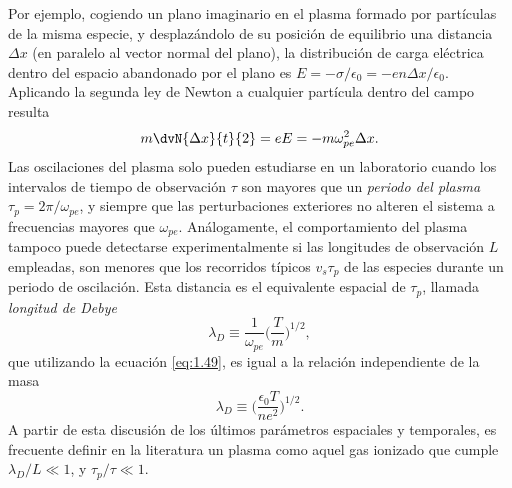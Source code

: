 Por ejemplo, cogiendo un plano imaginario en el plasma formado por partículas de la misma especie, y desplazándolo de su posición de equilibrio una distancia $\Delta x$ (en paralelo al vector normal del plano), la distribución de carga eléctrica dentro del espacio abandonado por el plano es $E = - \sigma/\epsilon_{0} = -en \Delta x/\epsilon_{0}$. Aplicando la segunda ley de Newton a cualquier partícula dentro del campo resulta
\begin{equation}\label{eq:1.50}
  m \dvN{\Delta x}{t}{2} = eE = -m \omega^{2}_{pe} \Delta x.
\end{equation}
Las oscilaciones del plasma solo pueden estudiarse en un laboratorio cuando los intervalos de tiempo de observación $\tau$ son mayores que un \emph{periodo del plasma} $\tau_{p}=2 \pi/\omega_{pe}$, y siempre que las perturbaciones exteriores no alteren el sistema a frecuencias mayores que $\omega_{pe}$. Análogamente, el comportamiento del plasma tampoco puede detectarse experimentalmente si las longitudes de observación $L$ empleadas, son menores que los recorridos típicos $v_{s} \tau_{p}$ de las especies durante un periodo de oscilación. Esta distancia es el equivalente espacial de $\tau_{p}$, llamada \emph{longitud de Debye}
\begin{equation}\label{eq:1.51}
  \lambda_{D} \equiv \frac{1}{\omega_{pe}}\bigg(\frac{T}{m}\bigg)^{1/2},
\end{equation}
que utilizando la ecuación \eqref{eq:1.49}, es igual a la relación independiente de la masa
\begin{equation}\label{eq:1.52}
  \lambda_{D} \equiv \bigg(\frac{\epsilon_{0}T}{ne^{2}}\bigg)^{1/2}.
\end{equation}
A partir de esta discusión de los últimos parámetros espaciales y temporales, es frecuente definir en la literatura \autocite{Fitzpatrick2022} un plasma como aquel gas ionizado que cumple $\lambda_{D}/L \ll 1$, y $\tau_{p}/\tau \ll 1$. 

